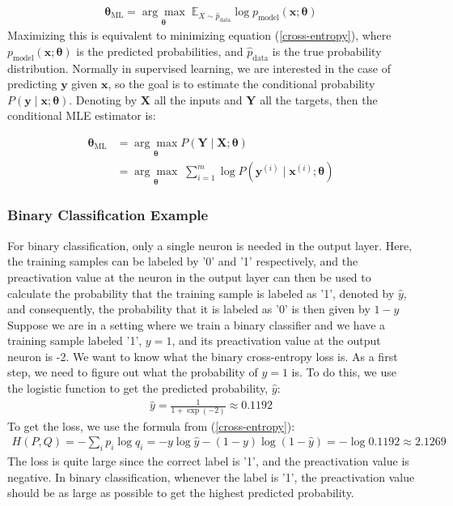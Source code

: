\begin{align*}
    \boldsymbol{\theta}_{\text{ML}} = \underset{\boldsymbol{\theta}}{\arg \max} \; \mathbb{E}_{X \sim \hat{p}_{\text{data}}} \log p_{\text{model}} (\mathbf{x}; \boldsymbol{\theta})
\end{align*}
Maximizing this is equivalent to minimizing equation (\ref{cross-entropy}), where $p_{\text{model}}(\mathbf{x}; \boldsymbol{\theta})$ is the predicted probabilities, and $\hat{p}_{\text{data}}$ is the true probability distribution. Normally in supervised learning, we are interested in the case of predicting $\mathbf{y}$ given $\mathbf{x}$, so the goal is to estimate the conditional probability $P(\mathbf{y} \mid \mathbf{x}; \boldsymbol{\theta})$. Denoting by $\mathbf{X}$ all the inputs and $\mathbf{Y}$ all the targets, then the conditional MLE estimator is:

\begin{align*}
    \boldsymbol{\theta}_{\text{ML}} &= \underset{\boldsymbol{\theta}}{\arg \max}P(\mathbf{Y} \mid \mathbf{X}; \boldsymbol{\theta}) \\
    & = \underset{\boldsymbol{\theta}}{\arg \max} \; \sum_{i=1} ^m \log P (\mathbf{y} ^{(i)} \mid \mathbf{x}^{(i)}; \boldsymbol{\theta})
\end{align*}





\subsubsection{Binary Classification Example}
For binary classification, only a single neuron is needed in the output layer. Here, the training samples can be labeled by '0' and '1' respectively, and the preactivation value at the neuron in the output layer can then be used to calculate the probability that the training sample is labeled as '1', denoted by $\hat{y}$, and consequently, the probability that it is labeled as '0' is then given by $1 - \hat{y}$\\
\noindent Suppose we are in a setting where we train a binary classifier and we have a training sample labeled '1', $y=1$, and its preactivation value at the output neuron is -2. We want to know what the binary cross-entropy loss is. As a first step, we need to figure out what the probability of $y = 1$ is. To do this, we use the logistic function to get the predicted probability, $\hat{y}$:
\begin{align*}
    \hat{y} = \frac{1}{1 + \exp(-2)} \approx 0.1192 
\end{align*}
To get the loss, we use the formula from (\ref{cross-entropy}):
\begin{align*}
    H(P,Q) = - \sum_i p_i \log q_i = -y \log \hat{y} - (1-y) \log(1-\hat{y}) = - \log{0.1192} \approx 2.1269
\end{align*}
The loss is quite large since the correct label is '1', and the preactivation value is negative. In binary classification, whenever the label is '1', the preactivation value should be as large as possible to get the highest predicted probability. 

